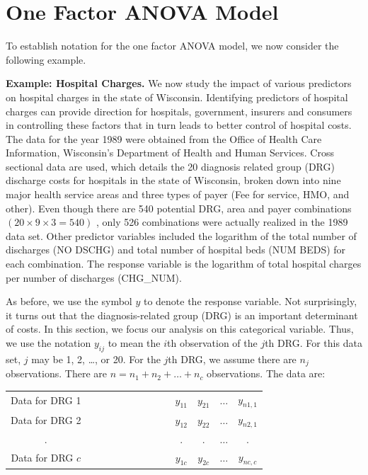 \section{One Factor ANOVA Model}

To establish notation for the one factor ANOVA model, we now
consider the following example.

\linejed

\textbf{Example: Hospital Charges.} We
now study the impact of various predictors on hospital charges in
the state of Wisconsin. Identifying predictors of hospital charges
can provide direction for hospitals, government, insurers and
consumers in controlling these factors that in turn leads to better
control of hospital costs. The data for the year 1989 were obtained
from the Office of Health Care Information, Wisconsin's Department
of Health and Human Services. Cross sectional data are used, which
details the 20 diagnosis related group (DRG) discharge costs for
hospitals in the state of Wisconsin, broken down into nine major
health service areas and three types of payer (Fee for service, HMO,
and other). Even though there
are 540 potential DRG, area and payer combinations $(20\times 9\times 3=540)$%
, only 526 combinations were actually realized in the 1989 data set. Other
predictor variables included the logarithm of the total number of discharges
(NO DSCHG) and total number of hospital beds (NUM BEDS) for each
combination. The response variable is the logarithm of total hospital
charges per number of discharges (CHG\_NUM).

As before, we use the symbol $y$ to denote the response variable.
Not surprisingly, it turns out that the diagnosis-related group
(DRG) is an important determinant of costs. In this section, we
focus our analysis on this categorical variable. Thus, we use the
notation $y_{ij}$ to mean the $i$th observation of the $j$th DRG.
For this data set, $j$ may be 1, 2, \ldots , or 20. For the $j$th
DRG, we assume there are $n_{j}$ observations. There are
$n=n_1+n_2+\ldots +n_{c}$ observations. The data are:

\begin{center}
\begin{tabular}{cccccc}
Data for DRG 1 & \ \ \ \ \ \ \ \ \ \ \ \ \ \ \  & $y_{11}$ & $y_{21}$ & $%
\ldots $ & $y_{n1,1}$ \\
Data for DRG 2 &  & $y_{12}$ & $y_{22}$ & $\ldots $ & $y_{n2,1}$ \\
. &  & $.$ & $.$ & $\ldots$ & $.$ \\
Data for DRG $c$ &  & $y_{1c}$ & $y_{2c}$ & $\ldots $ & $y_{nc,c}$%
\end{tabular}
\end{center}

